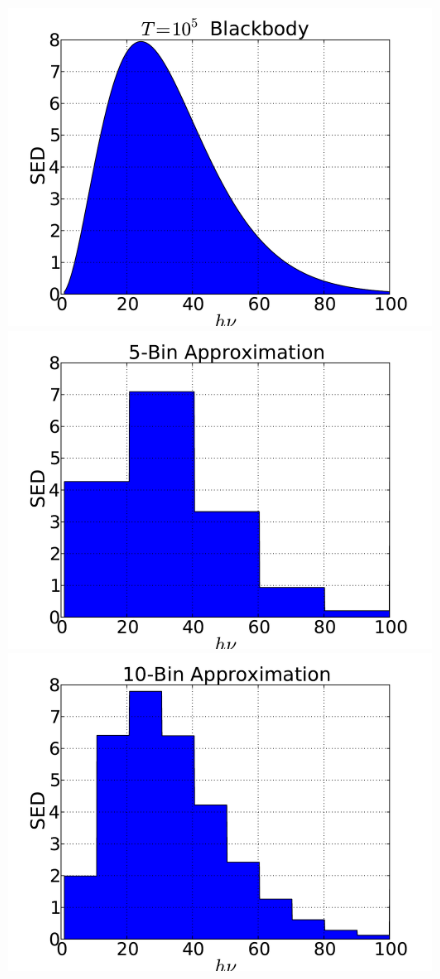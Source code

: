 \documentclass[10pt]{article}
\renewcommand{\(}{\left(}
\renewcommand{\)}{\right)}
\begin{document}
\begin{itemize}
  \begin{figure}[h]
    \centerline{\hfill
      \includegraphics[scale=0.3, trim=1.0cm 0.5cm 1.25cm 0.5cm]{blackbody.pdf}
      \includegraphics[scale=0.3, trim=1.0cm 0.5cm 1.25cm 0.5cm]{blackbody-5bin.pdf}
      \includegraphics[scale=0.3, trim=1.0cm 0.5cm 1.25cm 0.5cm]{blackbody-10bin.pdf}
}
\end{figure}
\end{itemize}
\end{document}
